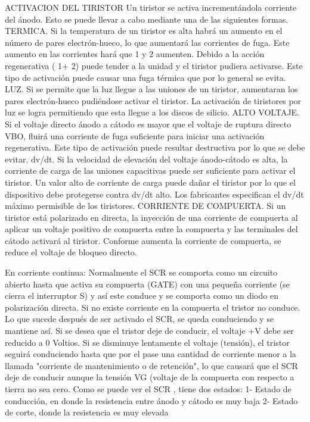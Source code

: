 \documentclass[12pt]{article}
\begin{document}
ACTIVACION DEL TIRISTOR
Un tiristor se activa incrementándola corriente del ánodo. Esto se puede llevar a cabo  mediante una de las siguientes formas.
TERMICA.   Si la temperatura de un tiristor es alta habrá un aumento en el número de pares electrón-hueco, lo que aumentará las corrientes de fuga. Este aumento en las corrientes hará que      1 y     2  aumenten. Debido a la acción regenerativa (   1+   2) puede tender a la unidad y el tiristor pudiera activarse. Este tipo de activación puede causar una fuga térmica que por lo general se evita.
LUZ.   Si se permite que la luz llegue a las uniones de un tiristor, aumentaran los pares electrón-hueco pudiéndose activar el  tiristor. La activación de tiristores por luz se logra permitiendo que esta llegue a los discos de silicio.
ALTO VOLTAJE.  Si el voltaje directo ánodo  a cátodo es mayor que el voltaje de ruptura directo VBO, fluirá una corriente de fuga suficiente para iniciar una activación regenerativa. Este tipo de activación puede resultar destructiva por lo que se debe evitar.
dv/dt.     Si la velocidad de elevación del voltaje ánodo-cátodo es alta, la corriente de carga de las uniones capacitivas puede ser suficiente para activar el tiristor. Un valor alto de corriente de carga puede dañar el tiristor por lo que el dispositivo debe protegerse contra dv/dt alto. Los fabricantes especifican el dv/dt máximo permisible de los tiristores.
CORRIENTE DE COMPUERTA.     Si un tiristor está polarizado en directa, la inyección de una corriente de compuerta al aplicar un voltaje positivo de compuerta entre la compuerta y las terminales del cátodo activará al tiristor. Conforme aumenta la corriente de compuerta, se reduce el voltaje de bloqueo directo.

En corriente continua:
Normalmente el SCR se comporta como un circuito abierto hasta que activa su compuerta (GATE) con una pequeña corriente (se cierra el interruptor S) y así este conduce y se comporta como un diodo en polarización directa. Si no existe corriente en la compuerta el tristor no conduce. Lo que sucede después de ser activado el SCR, se queda conduciendo y se mantiene así. Si se desea que el tristor deje de conducir, el voltaje +V debe ser reducido a 0 Voltios.
Si se disminuye lentamente el voltaje (tensión), el tristor seguirá conduciendo hasta que por el pase una cantidad de corriente menor a la llamada "corriente de mantenimiento o de retención", lo que causará que el SCR deje de conducir aunque la tensión VG (voltaje de la compuerta con respecto a tierra no sea cero.
Como se puede ver el SCR , tiene dos estados:
1- Estado de conducción, en donde la resistencia entre ánodo y cátodo es muy baja 
2- Estado de corte, donde la resistencia es muy elevada 
\end{document}

